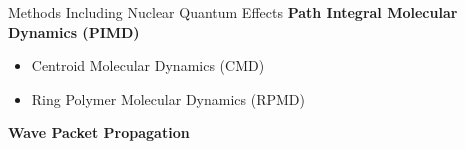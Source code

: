 \begin{frame}{Methods Including Nuclear Quantum Effects}
    \textbf{Path Integral Molecular Dynamics (PIMD)}
    \begin{itemize}
        \item Centroid Molecular Dynamics (CMD)
        \item Ring Polymer Molecular Dynamics (RPMD)
    \end{itemize}
    \vspace{1em}

    \textbf{Wave Packet Propagation}
\end{frame}